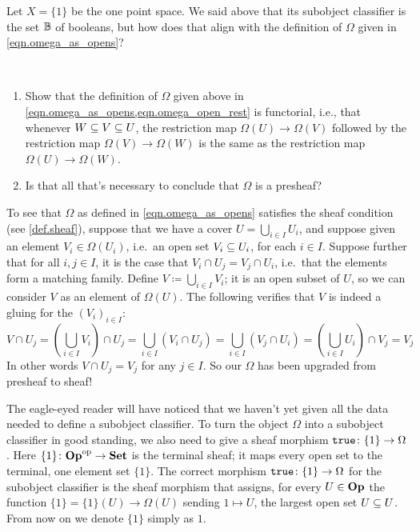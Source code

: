 \documentclass[7Sketches]{subfiles}
\begin{document}
\begin{exercise}%
\label{exc.booleans_as_subspace_1}%
Let $X=\{1\}$ be the one point space. We said above that its subobject classifier is the set $\bb$ of booleans, but how does that align with the definition of $\Omega$ given in \cref{eqn.omega_as_opens}?
\end{exercise}


\begin{exercise}%
\label{exc.Omega_functorial}~
\begin{enumerate}
	\item Show that the definition of $\Omega$ given above in \cref{eqn.omega_as_opens,eqn.omega_open_rest} is functorial, i.e., that whenever $W\ss V\ss U$, the restriction map $\Omega(U)\to\Omega(V)$ followed by the restriction map $\Omega(V)\to\Omega(W)$ is the same as the restriction map $\Omega(U)\to\Omega(W)$.
	\item Is that all that's necessary to conclude that $\Omega$ is a presheaf?
\qedhere
\end{enumerate}
\end{exercise}



To see that $\Omega$ as defined in \cref{eqn.omega_as_opens} satisfies the sheaf condition (see \cref{def.sheaf}), suppose that we have a cover
$U=\bigcup_{i\in I}U_i$, and suppose given an element $V_i\in\Omega(U_i)$, i.e.\
an open set $V_i\ss U_i$, for each $i\in I$. Suppose further that for all
$i,j\in I$, it is the case that $V_i\cap U_j=V_j\cap U_i$, i.e.\ that the
elements form a matching family. Define
$V\coloneqq\bigcup_{i\in I}V_i$; it is an open subset of $U$, so we can consider
$V$ as an element of $\Omega(U)$. The following verifies that $V$ is indeed a gluing for the $(V_i)_{i\in I}$:
\[V\cap U_j=\left(\bigcup_{i\in I}V_i\right)\cap U_j=\bigcup_{i\in I}(V_i\cap U_j)=\bigcup_{i\in I}(V_j\cap U_i)=\left(\bigcup_{i\in I}U_i\right)\cap V_j=V_j\]
In other words $V\cap U_j=V_j$ for any $j\in I$. So our $\Omega$ has been upgraded from presheaf to sheaf!

The eagle-eyed reader will have noticed that we haven't yet given all the data
needed to define a subobject classifier. To turn the object $\Omega$ into a subobject classifier in good standing, we also need to give a sheaf morphism
$\true\colon\{1\} \to \Omega$. Here $\{1\}\colon \Op\op \to \smset$ is the terminal
sheaf; it maps every open set to the terminal, one element set $\{1\}$. The correct morphism
$\true\colon \{1\} \to \Omega$ for the subobject classifier is the sheaf morphism that assigns, for
every $U \in \Op$ the function $\{1\}=\{1\}(U)\to\Omega(U)$ sending $1\mapsto U$, the largest open set $U\ss U$. From now on we denote $\{1\}$ simply as $1$.
\end{document}
